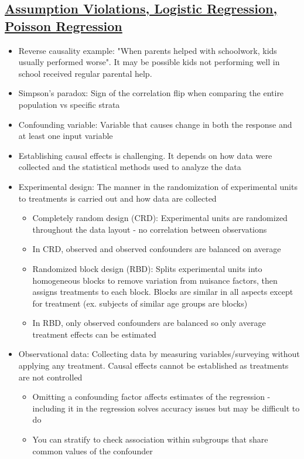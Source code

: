 \documentclass[8pt,landscape,a4paper, fleqn, dvipsnames]{extarticle}
\begin{document}
\begin{multicols*}{4}
\section*{\ul{Assumption Violations, Logistic Regression, Poisson Regression}}
\begin{itemize}
    \item Reverse causality example: "When parents helped with schoolwork, kids usually performed worse". It may be possible kids not performing well in school received regular parental help.
    \item Simpson's paradox: Sign of the correlation flip when comparing the entire population vs specific strata
    \item Confounding variable: Variable that causes change in both the response and at least one input variable
    \item Establishing causal effects is challenging. It depends on how data were collected and the statistical methods used to analyze the data
    \item Experimental design: The manner in the randomization of experimental units to treatments is carried out and how data are collected
    \begin{itemize}
        \item Completely random design (CRD): Experimental units are randomized throughout the data layout - no correlation between observations
        \item In CRD, observed and observed confounders are balanced on average
        \item Randomized block design (RBD): Splits experimental units into homogeneous blocks to remove variation from nuisance factors, then assigns treatments to each block. Blocks are similar in all aspects except for treatment (ex. subjects of similar age groups are blocks)
        \item In RBD, only observed confounders are balanced so only average treatment effects can be estimated
    \end{itemize}
    \item Observational data: Collecting data by measuring variables/surveying without applying any treatment. Causal effects cannot be established as treatments are not controlled
    \begin{itemize}
        \item Omitting a confounding factor affects estimates of the regression - including it in the regression solves accuracy issues but may be difficult to do
        \item You can stratify to check association within subgroups that share common values of the confounder

\end{itemize}
\end{itemize}
\end{multicols*}
\end{document}
